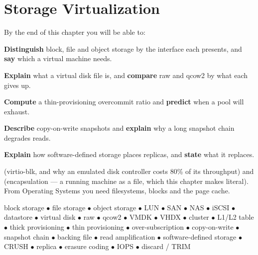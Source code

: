 \chapter{Storage Virtualization}\label{ch:storage}

\begin{outcomes}
By the end of this chapter you will be able to:
\begin{tight}
  \item \textbf{Distinguish} block, file and object storage by the interface
        each presents, and \textbf{say} which a virtual machine needs.
  \item \textbf{Explain} what a virtual disk file is, and \textbf{compare} raw
        and qcow2 by what each gives up.
  \item \textbf{Compute} a thin-provisioning overcommit ratio and
        \textbf{predict} when a pool will exhaust.
  \item \textbf{Describe} copy-on-write snapshots and \textbf{explain} why a
        long snapshot chain degrades reads.
  \item \textbf{Explain} how software-defined storage places replicas, and
        \textbf{state} what it replaces.
\end{tight}
\end{outcomes}

\begin{prereq}
 (virtio-blk, and why an emulated disk controller costs 80\% of
its throughput) and  (encapsulation --- a running machine as a
file, which this chapter makes literal). From Operating Systems you need
filesystems, blocks and the page cache.
\end{prereq}

\begin{keyterms}
block storage $\bullet$ file storage $\bullet$ object storage $\bullet$ LUN
$\bullet$ SAN $\bullet$ NAS $\bullet$ iSCSI $\bullet$ datastore $\bullet$
virtual disk $\bullet$ raw $\bullet$ qcow2 $\bullet$ VMDK $\bullet$ VHDX
$\bullet$ cluster $\bullet$ L1/L2 table $\bullet$ thick provisioning $\bullet$
thin provisioning $\bullet$ over-subscription $\bullet$ copy-on-write $\bullet$
snapshot chain $\bullet$ backing file $\bullet$ read amplification $\bullet$
software-defined storage $\bullet$ CRUSH $\bullet$ replica $\bullet$ erasure
coding $\bullet$ IOPS $\bullet$ discard / TRIM
\end{keyterms}


